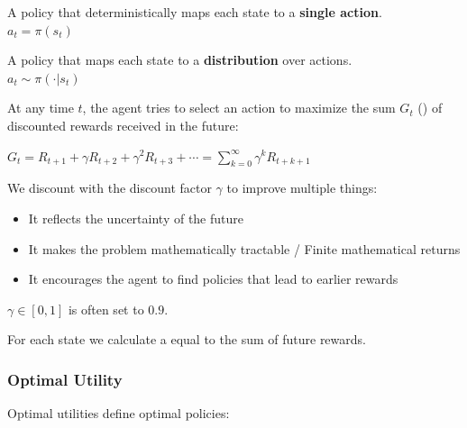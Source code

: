 \documentclass[
../EiKI_Summary.tex,
]
{subfiles}
\begin{document}
\begin{minipage}
    [t]{0.5\textwidth}
    \begin{defbox}
        \centering
        A policy that deterministically maps each state to a \textbf{single action}.\\
        $a_t = \pi(s_t)$
    \end{defbox}
\end{minipage}
\begin{minipage}
    [t]{0.5\textwidth}
    \begin{defbox}
        \centering
        A policy that maps each state to a \textbf{distribution} over actions.\\
        $a_t \sim \pi(\cdot|s_t)$
    \end{defbox}
\end{minipage}

At any time $t$, the agent tries to select an action to maximize the sum $G_t$ () of discounted rewards received in the future:

\begin{csmb*}
    $G_t = R_{t+1} + \gamma R_{t+2} + \gamma^2 R_{t+3} + \cdots = \sum_{k=0}^{\infty} \gamma^k R_{t+k+1}$
\end{csmb*}

We discount  with the discount factor $\gamma$ to improve multiple things:
\begin{itemize}
    \item It reflects the uncertainty of the future
    \item It makes the problem mathematically tractable / Finite mathematical returns
    \item It encourages the agent to find policies that lead to earlier rewards
\end{itemize}
$\gamma \in [0,1]$ is often set to $0.9$.

For each state we calculate a  equal to the sum of future rewards.

\subsubsection{Optimal Utility}
Optimal utilities define optimal policies:
\end{document}
